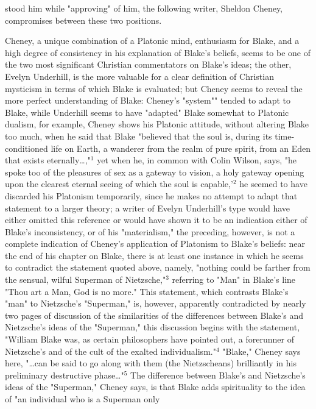 \noindent stood him while "approving" of him, the 
following writer, Sheldon Cheney, compromises between these two positions.\par
\vspace*{0.5\baselineskip}
Cheney, a unique combination of a Platonic mind, enthusiasm for Blake, and a high degree of consistency in his explanation
of Blake's beliefs, seems to be one of the two most significant Christian commentators on Blake's ideas; the other,
Evelyn Underhill, is the more valuable for a clear definition of Christian mysticism in terms of which Blake is evaluated;
but Cheney seems to reveal the more perfect understanding of Blake: Cheney's "system"" tended 
to adapt to Blake, while Underhill seems to have "adapted" Blake somewhat to Platonic dualism,
for example, Cheney shows his Platonic attitude, without altering Blake too much, when he said that
Blake "believed that the soul is, during its time-conditioned life on Earth, a wanderer from
the realm of pure spirit, from an Eden that exists eternally\dots,"$^{1}$ yet when he, in common
with Colin Wilson, says, "he spoke too of the pleasures of sex as a gateway to vision, a holy gateway 
opening upon the clearest eternal seeing of which the soul is capable,'$^{2}$ he seemed to have discarded
his Platonism temporarily, since he makes no attempt to adapt that statement to a larger theory; a 
writer of Evelyn Underhill's type would have either omitted this reference or would have shown it to be an indication 
either of Blake's inconsistency, or of his "materialism," the preceding, however, is not a complete indication 
of Cheney's application of Platonism to Blake's beliefs: near the end of his chapter on Blake, there is at least one 
instance in which he seems to contradict the statement quoted above, namely, "nothing could be farther from the sensual, wilful Superman
of Nietzsche,"$^{3}$ referring to "Man" in Blake's line "Thou art a Man, God is no more." This statement, which 
contrasts Blake's "man" to Nietzsche's "Superman," is, however, apparently contradicted by nearly two pages of discussion
of the similarities of the differences between Blake's and Nietzsche's ideas of the "Superman," this discussion
begins with the statement, "William Blake was, as certain philosophers have pointed out, a forerunner of Nietzsche's and
of the cult of the exalted individualism."$^{4}$ "Blake," Cheney says here, "\dots can be said to go along with them (the Nietzscheans)
brilliantly in his preliminary destructive phase\dots"$^{5}$ The difference between Blake's and Nietzsche's ideas
of the "Superman," Cheney says, is that Blake adds spirituality to the idea of "an individual who is a Superman only
